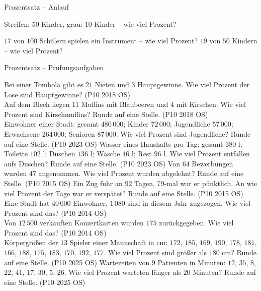 \begin{aufgabe}{Prozentsatz – Anlauf}
\begin{teile}
\teil Streifen: $50$ Kinder, grau: $10$ Kinder – wie viel Prozent?

\teil $17$ von $100$ Schülern spielen ein Instrument – wie viel Prozent? \leerfeld[\%]
\teil $19$ von $50$ Kindern – wie viel Prozent? \leerfeld[\%]
\end{teile}
\end{aufgabe}

\begin{aufgabe}{Prozentsatz – Prüfungsaufgaben}
\begin{teile}
\teil Bei einer Tombola gibt es $21$ Nieten und $3$ Hauptgewinne. Wie viel Prozent der Lose sind Hauptgewinne? \hfill (P10 2018 OS) \\ \leerfeld[\%]
\teil Auf dem Blech liegen $11$ Muffins mit Blaubeeren und $4$ mit Kirschen. Wie viel Prozent sind Kirschmuffins? Runde auf eine Stelle. \hfill (P10 2018 OS) \\ \leerfeld[\%]
\teil Einwohner einer Stadt: gesamt $480\,000$; Kinder $72\,000$; Jugendliche $57\,000$; Erwachsene $264\,000$; Senioren $87\,000$. Wie viel Prozent sind Jugendliche? Runde auf eine Stelle. \hfill (P10 2023 OS)
\teil Wasser eines Haushalts pro Tag: gesamt $380$ l; Toilette $102$ l; Duschen $136$ l; Wäsche $46$ l; Rest $96$ l. Wie viel Prozent entfallen aufs Duschen? Runde auf eine Stelle. \hfill (P10 2023 OS)
\teil Von $64$ Bewerbungen wurden $47$ angenommen. Wie viel Prozent wurden abgelehnt? Runde auf eine Stelle. \hfill (P10 2015 OS)
\teil Ein Zug fuhr an $92$ Tagen, $79$-mal war er pünktlich. An wie viel Prozent der Tage war er verspätet? Runde auf eine Stelle. \hfill (P10 2015 OS)
\teil Eine Stadt hat $40\,000$ Einwohner, $1\,080$ sind in diesem Jahr zugezogen. Wie viel Prozent sind das? \hfill (P10 2014 OS) \\ \leerfeld[\%]
\teil Von $12\,500$ verkauften Konzertkarten wurden $175$ zurückgegeben. Wie viel Prozent sind das? \hfill (P10 2014 OS) \\ \leerfeld[\%]
\teil Körpergrößen der $13$ Spieler einer Mannschaft in cm: $172$, $185$, $169$, $190$, $178$, $181$, $166$, $188$, $175$, $183$, $170$, $192$, $177$. Wie viel Prozent sind größer als $180$ cm? Runde auf eine Stelle. \hfill (P10 2025 OS)
\teil Wartezeiten von $9$ Patienten in Minuten: $12$, $35$, $8$, $22$, $41$, $17$, $30$, $5$, $26$. Wie viel Prozent warteten länger als $20$ Minuten? Runde auf eine Stelle. \hfill (P10 2025 OS)
\end{teile}
\end{aufgabe}

